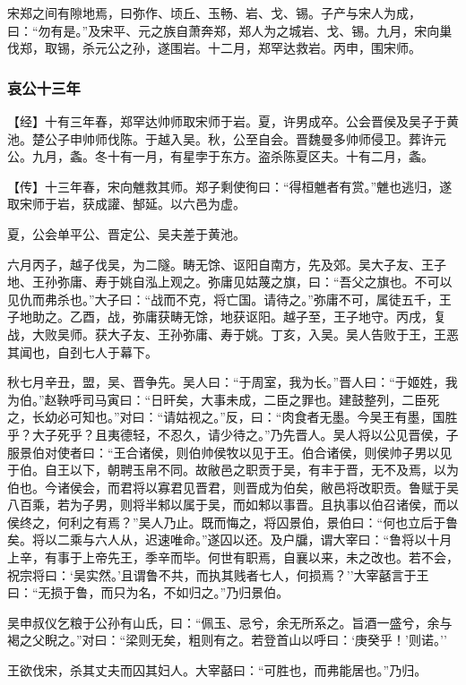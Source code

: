 \documentclass[]{article}
\begin{document}
宋郑之间有隙地焉，曰弥作、顷丘、玉畅、岩、戈、锡。子产与宋人为成，曰：``勿有是。''及宋平、元之族自萧奔郑，郑人为之城岩、戈、锡。九月，宋向巢伐郑，取锡，杀元公之孙，遂围岩。十二月，郑罕达救岩。丙申，围宋师。

\hypertarget{header-n3179}{%
\subsubsection{哀公十三年}\label{header-n3179}}

【经】十有三年春，郑罕达帅师取宋师于岩。夏，许男成卒。公会晋侯及吴子于黄池。楚公子申帅师伐陈。于越入吴。秋，公至自会。晋魏曼多帅师侵卫。葬许元公。九月，螽。冬十有一月，有星孛于东方。盗杀陈夏区夫。十有二月，螽。

【传】十三年春，宋向魋救其师。郑子剩使徇曰：``得桓魋者有赏。''魋也逃归，遂取宋师于岩，获成讙、郜延。以六邑为虚。

夏，公会单平公、晋定公、吴夫差于黄池。

六月丙子，越子伐吴，为二隧。畴无馀、讴阳自南方，先及郊。吴大子友、王子地、王孙弥庸、寿于姚自泓上观之。弥庸见姑蔑之旗，曰：``吾父之旗也。不可以见仇而弗杀也。''大子曰：``战而不克，将亡国。请待之。''弥庸不可，属徒五千，王子地助之。乙酉，战，弥庸获畴无馀，地获讴阳。越子至，王子地守。丙戌，复战，大败吴师。获大子友、王孙弥庸、寿于姚。丁亥，入吴。吴人告败于王，王恶其闻也，自刭七人于幕下。

秋七月辛丑，盟，吴、晋争先。吴人曰：``于周室，我为长。''晋人曰：``于姬姓，我为伯。''赵鞅呼司马寅曰：``日旰矣，大事未成，二臣之罪也。建鼓整列，二臣死之，长幼必可知也。''对曰：``请姑视之。''反，曰：``肉食者无墨。今吴王有墨，国胜乎？大子死乎？且夷德轻，不忍久，请少待之。''乃先晋人。吴人将以公见晋侯，子服景伯对使者曰：``王合诸侯，则伯帅侯牧以见于王。伯合诸侯，则侯帅子男以见于伯。自王以下，朝聘玉帛不同。故敝邑之职贡于吴，有丰于晋，无不及焉，以为伯也。今诸侯会，而君将以寡君见晋君，则晋成为伯矣，敝邑将改职贡。鲁赋于吴八百乘，若为子男，则将半邾以属于吴，而如邾以事晋。且执事以伯召诸侯，而以侯终之，何利之有焉？''吴人乃止。既而悔之，将囚景伯，景伯曰：``何也立后于鲁矣。将以二乘与六人从，迟速唯命。''遂囚以还。及户牖，谓大宰曰：``鲁将以十月上辛，有事于上帝先王，季辛而毕。何世有职焉，自襄以来，未之改也。若不会，祝宗将曰：`吴实然。'且谓鲁不共，而执其贱者七人，何损焉？''大宰嚭言于王曰：``无损于鲁，而只为名，不如归之。''乃归景伯。

吴申叔仪乞粮于公孙有山氏，曰：``佩玉、忌兮，余无所系之。旨酒一盛兮，余与褐之父睨之。''对曰：``梁则无矣，粗则有之。若登首山以呼曰：`庚癸乎！'则诺。''

王欲伐宋，杀其丈夫而囚其妇人。大宰嚭曰：``可胜也，而弗能居也。''乃归。
\end{document}
